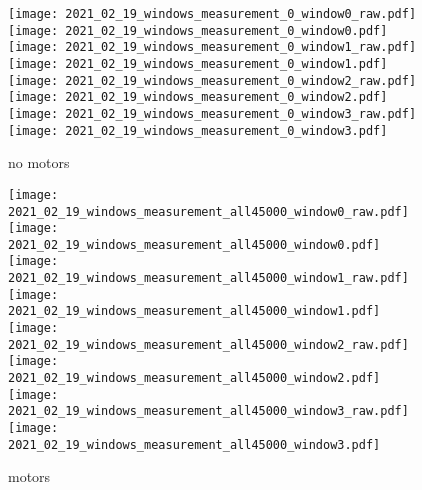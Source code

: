 \begin{figure}[h]
  \centering
  \begin{minipage}{\textwidth}
  \centering
  \texttt{[image: 2021\_02\_19\_windows\_measurement\_0\_window0\_raw.pdf]}
  \texttt{[image: 2021\_02\_19\_windows\_measurement\_0\_window0.pdf]}
  \texttt{[image: 2021\_02\_19\_windows\_measurement\_0\_window1\_raw.pdf]}
  \texttt{[image: 2021\_02\_19\_windows\_measurement\_0\_window1.pdf]}
  \texttt{[image: 2021\_02\_19\_windows\_measurement\_0\_window2\_raw.pdf]}
  \texttt{[image: 2021\_02\_19\_windows\_measurement\_0\_window2.pdf]}
  \texttt{[image: 2021\_02\_19\_windows\_measurement\_0\_window3\_raw.pdf]}
  \texttt{[image: 2021\_02\_19\_windows\_measurement\_0\_window3.pdf]}
  \end{minipage}
  \caption{no motors}
  \label{fig:measurement-no-motors}
\end{figure}

\begin{figure}[h]
  \centering
  \begin{minipage}{\textwidth}
  \centering
  \texttt{[image: 2021\_02\_19\_windows\_measurement\_all45000\_window0\_raw.pdf]}
  \texttt{[image: 2021\_02\_19\_windows\_measurement\_all45000\_window0.pdf]}
  \texttt{[image: 2021\_02\_19\_windows\_measurement\_all45000\_window1\_raw.pdf]}
  \texttt{[image: 2021\_02\_19\_windows\_measurement\_all45000\_window1.pdf]}
  \texttt{[image: 2021\_02\_19\_windows\_measurement\_all45000\_window2\_raw.pdf]}
  \texttt{[image: 2021\_02\_19\_windows\_measurement\_all45000\_window2.pdf]}
  \texttt{[image: 2021\_02\_19\_windows\_measurement\_all45000\_window3\_raw.pdf]}
  \texttt{[image: 2021\_02\_19\_windows\_measurement\_all45000\_window3.pdf]}
  \end{minipage}
  \caption{motors}
  \label{fig:measurement-motors}
\end{figure}

